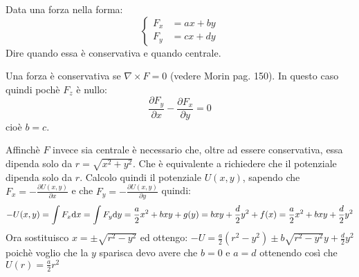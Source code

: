 \documentclass[../main.tex]{subfiles}
\begin{document}

\textex
Data una forza nella forma:
$$
\left\{
\begin{array}{rl}
F_x & = ax+by \\
F_y  & = cx+dy
\end{array}
\right.
$$
Dire quando essa è conservativa e quando centrale.


\solution

Una forza è conservativa se $\nabla \times F=0$ (vedere Morin pag. 150). In questo caso quindi pochè $F_z$ è nullo:
\begin{equation}\label{fcc:1}
 \frac{\partial F_y}{\partial x}- \frac{\partial F_x}{\partial y}=0
\end{equation}
cioè $b=c$.

Affinchè $F$ invece sia centrale è necessario che, oltre ad essere conservativa, essa dipenda solo da $r=\sqrt{x^2+y^2}$. Che è equivalente a richiedere
che il potenziale dipenda solo da $r$. Calcolo quindi il potenziale $U(x,y)$, sapendo che $F_x=-\frac{\partial U(x,y)}{ \partial x}$ e che
$F_y=-\frac{\partial U(x,y)}{ \partial y}$ quindi:
\begin{equation}\label{fcc:2}
 -U(x,y)=\int{F_x \ensuremath{\mathrm{d}}x}=\int{F_y \ensuremath{\mathrm{d}}y}=\frac{a}{2}x^2+bxy+g(y)=bxy+\frac{d}{2}y^2+f(x)=\frac{a}{2}x^2+bxy+\frac{d}{2}y^2
\end{equation}
Ora sostituisco $x=\pm \sqrt{r^2-y^2}$ ed ottengo: $-U=\frac{a}{2}(r^2-y^2) \pm b \sqrt{r^2-y^2}y+\frac{d}{2}y^2$ poichè voglio che la $y$ sparisca
 devo avere che $b=0$ e $a=d$ ottenendo così che $U(r)=\frac{a}{2}r^2$
\end{document}
